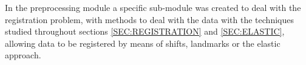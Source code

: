 In the preprocessing module a specific sub-module was created to deal with the
registration problem, with methods to deal with the data with the techniques
studied throughout sections \ref{SEC:REGISTRATION} and \ref{SEC:ELASTIC},
allowing data to be registered by means of shifts, landmarks or the elastic
approach.
